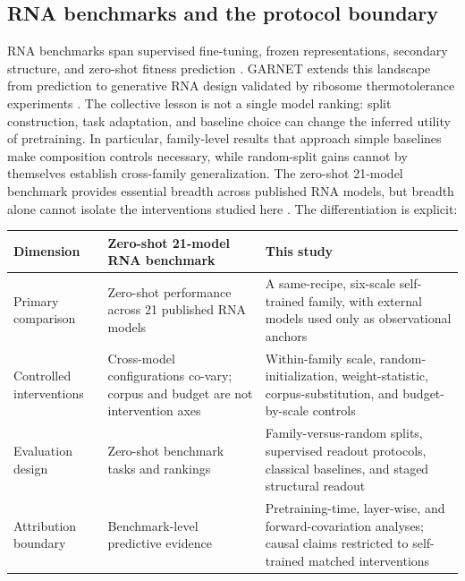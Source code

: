 \hypertarget{rna-benchmarks-and-the-protocol-boundary}{%
\subsection{RNA benchmarks and the protocol boundary}\label{rna-benchmarks-and-the-protocol-boundary}}

RNA benchmarks span supervised fine-tuning, frozen representations, secondary structure, and zero-shot fitness prediction \citep{beacon,genomic_finetuning,rnascope,nabench,zero_shot_rna,rnagym,mrnabench}. GARNET extends this landscape from prediction to generative RNA design validated by ribosome thermotolerance experiments \citep{garnet}. The collective lesson is not a single model ranking: split construction, task adaptation, and baseline choice can change the inferred utility of pretraining. In particular, family-level results that approach simple baselines make composition controls necessary, while random-split gains cannot by themselves establish cross-family generalization. The zero-shot 21-model benchmark provides essential breadth across published RNA models, but breadth alone cannot isolate the interventions studied here \citep{zero_shot_rna}. The differentiation is explicit:

\begin{longtable}[]{@{}
  >{\raggedright\arraybackslash}p{}
  >{\raggedright\arraybackslash}p{}
  >{\raggedright\arraybackslash}p{}@{}}
\toprule
Dimension & Zero-shot 21-model RNA benchmark & This study \\
\midrule
\endhead
Primary comparison & Zero-shot performance across 21 published RNA models & A same-recipe, six-scale self-trained family, with external models used only as observational anchors \\
Controlled interventions & Cross-model configurations co-vary; corpus and budget are not intervention axes & Within-family scale, random-initialization, weight-statistic, corpus-substitution, and budget-by-scale controls \\
Evaluation design & Zero-shot benchmark tasks and rankings & Family-versus-random splits, supervised readout protocols, classical baselines, and staged structural readout \\
Attribution boundary & Benchmark-level predictive evidence & Pretraining-time, layer-wise, and forward-covariation analyses; causal claims restricted to self-trained matched interventions \\
\bottomrule
\end{longtable}

